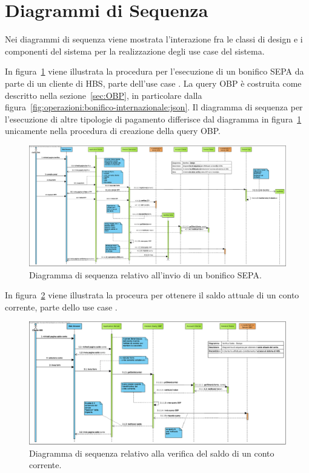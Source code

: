 
\section{Diagrammi di Sequenza}

Nei diagrammi di sequenza viene mostrata l'interazione fra le classi di design e i componenti del sistema per la realizzazione degli use case del sistema.

In figura~\ref{fig:sequenza:bonifico-sepa} viene illustrata la procedura per l'esecuzione di un bonifico SEPA da parte di un cliente di HBS, parte dell'use case \iducDISPAG.
La query OBP \`e costruita come descritto nella sezione~\ref{sec:OBP}, in particolare dalla figura~\ref{fig:operazioni:bonifico-internazionale:json}.
Il diagramma di sequenza per l'esecuzione di altre tipologie di pagamento differisce dal diagramma in figura~\ref{fig:sequenza:bonifico-sepa} unicamente nella procedura di creazione della query OBP.

\begin{figure}[h]
    \centering
	\includegraphics[width=\textheight, angle=90]{Images/sequence/Bonifico_-_Design.eps}
    \caption{Diagramma di sequenza relativo all'invio di un bonifico SEPA.}
    \label{fig:sequenza:bonifico-sepa}
\end{figure}

In figura~\ref{fig:sequenza:saldo} viene illustrata la proceura per ottenere il saldo attuale di un conto corrente, parte dello use case \iducVERSAL.

\begin{figure}[h]
    \centering
	\includegraphics[width=\textheight, angle=90]{Images/sequence/Verifica_Saldo_-_Design.eps}
    \caption{Diagramma di sequenza relativo alla verifica del saldo di un conto corrente.}
    \label{fig:sequenza:saldo}
\end{figure}

